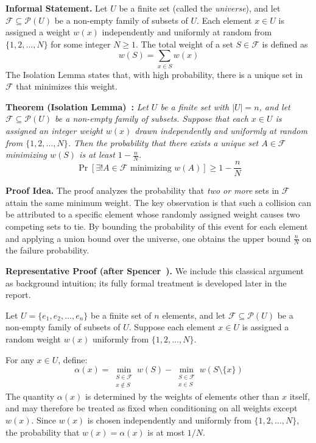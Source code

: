 \vspace{0.5cm}
\noindent
\textbf{Informal Statement.}
Let $U$ be a finite set (called the \emph{universe}), and let $\mathcal{F} \subseteq \mathcal{P}(U)$ be a non-empty family of subsets of $U$.
Each element $x \in U$ is assigned a weight $w(x)$ independently and uniformly at random from $\{1, 2, \dots, N\}$ for some integer $N \ge 1$.
The total weight of a set $S \in \mathcal{F}$ is defined as
\[
    w(S) = \sum_{x \in S} w(x)    
\]
The Isolation Lemma states that, with high probability, there is a unique set in $\mathcal{F}$ that minimizes this weight.

\vspace{0.5cm}
\noindent
\textbf{Theorem (Isolation Lemma)~\cite{mulmuley1987matching}:}
\emph{
    Let $U$ be a finite set with $|U| = n$, and let $\mathcal{F} \subseteq \mathcal{P}(U)$ be a non-empty family of subsets.
    Suppose that each $x \in U$ is assigned an integer weight $w(x)$ drawn independently and uniformly at random from $\{1, 2, \dots, N\}$.
    Then the probability that there exists a unique set $A \in \mathcal{F}$ minimizing $w(S)$ is at least $1 - \frac{n}{N}$.
}
\[
    \Pr[\exists! A \in \mathcal{F} \text{ minimizing } w(A)] \ge 1 - \frac{n}{N} 
\]

\vspace{0.5cm}
\noindent
\textbf{Proof Idea.}
The proof analyzes the probability that \emph{two or more} sets in $\mathcal{F}$ attain the same minimum weight.
The key observation is that such a collision can be attributed to a specific element whose randomly assigned weight causes two competing sets to tie.
By bounding the probability of this event for each element and applying a union bound over the universe, one obtains the upper bound $\frac{n}{N}$ on the failure probability.

\vspace{0.5cm}
\noindent
\textbf{Representative Proof (after Spencer~\cite{spencer1995probabilistic}).}
We include this classical argument as background intuition;
its fully formal treatment is developed later in the report.

Let $U = \{e_1, e_2, \dots, e_n\}$ be a finite set of $n$ elements, and let $\mathcal{F} \subseteq \mathcal{P}(U)$ be a non-empty family of subsets of $U$.
Suppose each element $x \in U$ is assigned a random weight $w(x)$ uniformly from $\{1, 2, \dots, N\}$.

For any $x \in U$, define:
\[
\alpha(x) = \min_{\substack{S \in \mathcal{F} \\ x \notin S}} w(S) - \min_{\substack{S \in \mathcal{F} \\ x \in S}} w(S \setminus \{x\})
\]
The quantity $\alpha(x)$ is determined by the weights of elements other than $x$ itself, and may therefore be treated as fixed when conditioning on all weights except $w(x)$. 
Since $w(x)$ is chosen independently and uniformly from $\{1, 2, \dots, N\}$, the probability that $w(x) = \alpha(x)$ is at most $1/N$.

